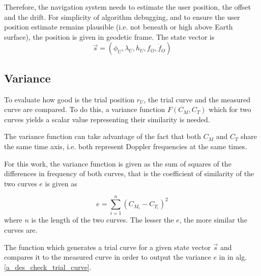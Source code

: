 Therefore, the navigation system needs to estimate the user position, the offset and the drift. For simplicity of algorithm debugging, and to ensure the user position estimate remains plausible (i.e. not beneath or high above Earth surface), the position is given in geodetic frame. The state vector is
\begin{equation*}
    \Vec{s} = (\phi_U, \lambda_U, h_U, f_O, \dot f_O)
\end{equation*}

\subsection{Variance} %
To evaluate how good is the trial position $r_U$, the trial curve and the measured curve are compared. To do this, a variance function $F(C_M, C_T)$ which for two curves yields a scalar value representing their similarity is needed.

The variance function can take advantage of the fact that both $C_M$ and $C_T$ share the same time axis, i.e. both represent Doppler frequencies at the same times.

For this work, the variance function is given as the sum of squares of the differences in frequency of both curves, that is the coefficient of similarity of the two curves $e$ is given as

\begin{equation}
    e = \sum_{i=1}^n (C_{M_i} - C_{T_i})^2
\end{equation}
where $n$ is the length of the two curves. The lesser the $e$, the more similar the curves are.

The function which generates a trial curve for a given state vector $\Vec{s}$ and compares it to the measured curve in order to output the variance $e$ in in alg.
\ref{a_des_check_trial_curve}.


